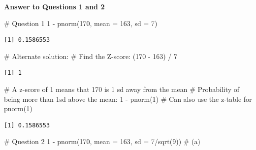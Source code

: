 \documentclass[
  letterpaper,
  DIV=11,
  numbers=noendperiod,
  oneside]{scrreprt}
\newenvironment{Shaded}{\begin{snugshade}}{\end{snugshade}}
\newcommand{\AttributeTok}[1]{\textcolor[rgb]{0.40,0.45,0.13}{#1}}
\newcommand{\CommentTok}[1]{\textcolor[rgb]{0.37,0.37,0.37}{#1}}
\newcommand{\DecValTok}[1]{\textcolor[rgb]{0.68,0.00,0.00}{#1}}
\newcommand{\FunctionTok}[1]{\textcolor[rgb]{0.28,0.35,0.67}{#1}}
\newcommand{\NormalTok}[1]{\textcolor[rgb]{0.00,0.23,0.31}{#1}}
\newcommand{\SpecialCharTok}[1]{\textcolor[rgb]{0.37,0.37,0.37}{#1}}
\begin{document}
\textbf{Answer to Questions 1 and 2}

\begin{Shaded}
\begin{Highlighting}[]
\CommentTok{\# Question 1}
\DecValTok{1} \SpecialCharTok{{-}} \FunctionTok{pnorm}\NormalTok{(}\DecValTok{170}\NormalTok{, }\AttributeTok{mean =} \DecValTok{163}\NormalTok{, }\AttributeTok{sd =} \DecValTok{7}\NormalTok{)}
\end{Highlighting}
\end{Shaded}

\begin{verbatim}
[1] 0.1586553
\end{verbatim}

\begin{Shaded}
\begin{Highlighting}[]
\CommentTok{\# Alternate solution:}
\CommentTok{\# Find the Z{-}score:}
\NormalTok{(}\DecValTok{170} \SpecialCharTok{{-}} \DecValTok{163}\NormalTok{) }\SpecialCharTok{/} \DecValTok{7} 
\end{Highlighting}
\end{Shaded}

\begin{verbatim}
[1] 1
\end{verbatim}

\begin{Shaded}
\begin{Highlighting}[]
\CommentTok{\# A z{-}score of 1 means that 170 is 1 sd away from the mean}
\CommentTok{\# Probability of being more than 1sd above the mean:}
\DecValTok{1} \SpecialCharTok{{-}} \FunctionTok{pnorm}\NormalTok{(}\DecValTok{1}\NormalTok{) }\CommentTok{\# Can also use the z{-}table for pnorm(1)}
\end{Highlighting}
\end{Shaded}

\begin{verbatim}
[1] 0.1586553
\end{verbatim}

\begin{Shaded}
\begin{Highlighting}[]
\CommentTok{\# Question 2}
\DecValTok{1} \SpecialCharTok{{-}} \FunctionTok{pnorm}\NormalTok{(}\DecValTok{170}\NormalTok{, }\AttributeTok{mean =} \DecValTok{163}\NormalTok{, }\AttributeTok{sd =} \DecValTok{7}\SpecialCharTok{/}\FunctionTok{sqrt}\NormalTok{(}\DecValTok{9}\NormalTok{)) }\CommentTok{\# (a)}
\end{Highlighting}
\end{Shaded}
\end{document}
